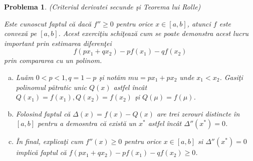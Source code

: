 \documentclass[a4paper,12pt,oneside]{report}
\newtheorem{problem}{Problema}
\begin{document}
\begin{problem} (Criteriul derivatei secunde \c{s}i Teorema lui Rolle)

Este cunoscut faptul c\u{a} dac\u{a} \({f}'' \geq 0\) pentru orice \(x\in \left [ a,b \right ]\), atunci \(f\) este convex\u{a} pe \(\left [ a,b \right ]\). Acest exerci\c{t}iu schi\c{t}eaz\u{a} cum se poate demonstra acest lucru important prin estimarea diferen\c{t}ei
\begin{displaymath}
  f\left ( px_{1} + qx_{2}\right ) - pf\left ( x_{1} \right ) - qf\left ( x_{2} \right )
\end{displaymath}
 prin compararea cu un polinom.
 \begin{enumerate}[a)]
\item Lu\u{a}m \(0< p < 1, q = 1-p\) \c{s}i not\u{a}m \(mu = px_{1} + px_{2}\) unde \(x_{1} < x_{2}\).  Gasi\c{t}i polinomul p\u{a}tratic unic \(Q\left ( x \right )\) astfel \^{i}nc\^{a}t  \(Q\left ( x_{1} \right ) = f\left ( x_{1} \right ), Q\left ( x_{2} \right ) = f\left ( x_{2} \right )\) \c{s}i \(Q\left ( \mu  \right ) = f\left ( \mu  \right )\).
\item Folosind faptul c\u{a} \(\Delta \left ( x \right ) =  f\left ( x \right ) - Q\left ( x \right )\) are trei zerouri distincte \^{i}n \(\left [ a,b \right ]\) pentru a demosntra c\u{a} exist\u{a} un \(x^{*}\) astfel \^{i}nc\^{a}t \({\Delta }''\left ( x^{*} \right ) = 0\).
\item \^{I}n final, explica\c{t}i cum \({f}''\left ( x \right ) \geq 0\) pentru orice \(x\in \left [ a,b \right ]\) si \({\Delta }''\left ( x^{*} \right ) = 0\) implic\u{a} faptul c\u{a} \(f\left ( px_{1} + qx_{2} \right ) - pf\left ( x_{1} \right ) - qf\left ( x_{2} \right ) \geq 0\).
\end{enumerate}
\end{problem}
\end{document}
